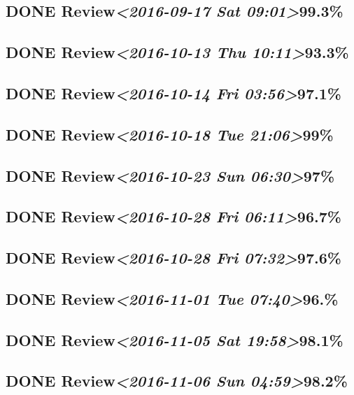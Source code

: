 \documentclass[11pt]{ctexart}
\begin{document}
\subsection{{\bfseries\sffamily DONE} Review\textit{<2016-09-17 Sat 09:01>}99.3\%}
\label{sec:org1cedbbc}
\subsection{{\bfseries\sffamily DONE} Review\textit{<2016-10-13 Thu 10:11>}93.3\%}
\label{sec:org9d57ada}
\subsection{{\bfseries\sffamily DONE} Review\textit{<2016-10-14 Fri 03:56>}97.1\%}
\label{sec:org67c9ae3}
\subsection{{\bfseries\sffamily DONE} Review\textit{<2016-10-18 Tue 21:06>}99\%}
\label{sec:org127db93}
\subsection{{\bfseries\sffamily DONE} Review\textit{<2016-10-23 Sun 06:30>}97\%}
\label{sec:org4e8d1f3}
\subsection{{\bfseries\sffamily DONE} Review\textit{<2016-10-28 Fri 06:11>}96.7\%}
\label{sec:orgd75bcf9}
\subsection{{\bfseries\sffamily DONE} Review\textit{<2016-10-28 Fri 07:32>}97.6\%}
\label{sec:org53e51a2}
\subsection{{\bfseries\sffamily DONE} Review\textit{<2016-11-01 Tue 07:40>}96.\%}
\label{sec:orgc51ee4a}
\subsection{{\bfseries\sffamily DONE} Review\textit{<2016-11-05 Sat 19:58>}98.1\%}
\label{sec:orgae86831}
\subsection{{\bfseries\sffamily DONE} Review\textit{<2016-11-06 Sun 04:59>}98.2\%}
\label{sec:org86f1c66}
\end{document}
